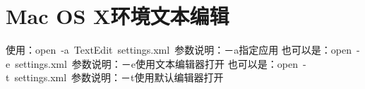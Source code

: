 \section{Mac OS X环境文本编辑}

使用：open -a TextEdit settings.xml 参数说明：－a指定应用
也可以是：open -e settings.xml 参数说明：－e使用文本编辑器打开
也可以是：open -t settings.xml 参数说明：－t使用默认编辑器打开



